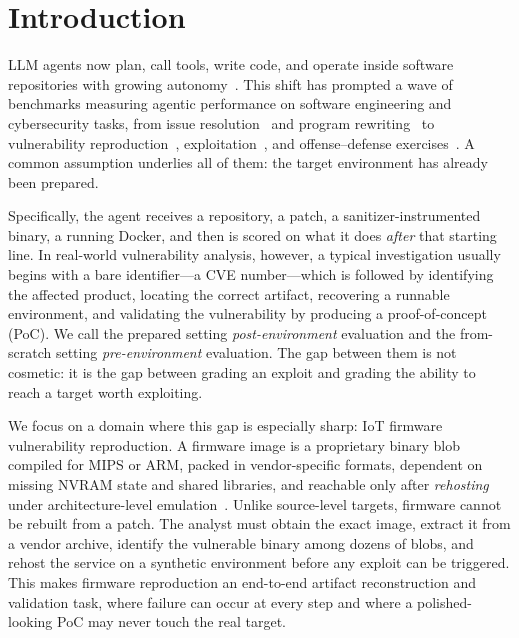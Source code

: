 \section{Introduction}

%
LLM agents now plan, call tools, write code, and operate inside software repositories with growing autonomy~\cite{swebench,programbench}. 
%
This shift has prompted a wave of benchmarks measuring agentic performance on software engineering and cybersecurity tasks, from issue resolution~\cite{swebench} and program rewriting~\cite{programbench} to vulnerability reproduction~\cite{cybergym,krepro}, exploitation~\cite{cvebench,exploitgym,exploitbench}, and offense--defense exercises~\cite{bountybench,secbench}. 
%
A common assumption underlies all of them: the target environment has already been prepared. 

%
Specifically, the agent receives a repository, a patch, a sanitizer-instrumented binary, a running Docker, and then is scored on what it does \emph{after} that starting line. 
%
In real-world vulnerability analysis, however, a typical investigation usually begins with a bare identifier---a CVE number---which is followed by identifying the affected product, locating the correct artifact, recovering a runnable environment, and validating the vulnerability by producing a proof-of-concept (PoC). 
%
We call the prepared setting \emph{post-environment} evaluation and the from-scratch setting \emph{pre-environment} evaluation. 
%
The gap between them is not cosmetic: it is the gap between grading an exploit and grading the ability to reach a target worth exploiting.


We focus on a domain where this gap is especially sharp: IoT firmware vulnerability reproduction. 
%
A firmware image is a proprietary binary blob compiled for MIPS or ARM, packed in vendor-specific formats, dependent on missing NVRAM state and shared libraries, and reachable only after \textit{rehosting} under architecture-level emulation~\cite{challenges,firmadyne,firmae}.
%
Unlike source-level targets, firmware cannot be rebuilt from a patch. The analyst must obtain the exact image, extract it from a vendor archive, identify the vulnerable binary among dozens of blobs, and rehost the service on a synthetic environment before any exploit can be triggered. 
%
This makes firmware reproduction an end-to-end artifact reconstruction and validation task, where failure can occur at every step and where a polished-looking PoC may never touch the real target. 
%


